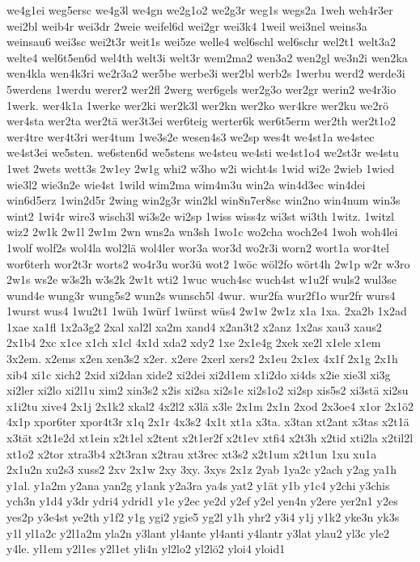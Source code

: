{we4g1ei
weg5ersc
we4g3l
we4gn
we2g1o2
we2g3r
weg1s
wegs2a
1weh
weh4r3er
wei2bl
weib4r
wei3dr
2weie
weifel6d
wei2gr
wei3k4
1weil
wei3nel
weins3a
weinsau6
wei3sc
wei2t3r
weit1s
wei5ze
welle4
wel6schl
wel6schr
wel2t1
welt3a2
welte4
wel6t5en6d
wel4th
welt3i
welt3r
wem2ma2
wen3a2
wen2gl
we3n2i
wen2ka
wen4kla
wen4k3ri
we2r3a2
wer5be
werbe3i
wer2bl
werb2s
1werbu
werd2
werde3i
5werdens
1werdu
werer2
wer2fl
2werg
wer6gels
wer2g3o
wer2gr
werin2
we4r3io
1werk.
wer4k1a
1werke
wer2ki
wer2k3l
wer2kn
wer2ko
wer4kre
wer2ku
we2rö
wer4sta
wer2ta
wer2tä
wer3t3ei
wer6teig
werter6k
wer6t5erm
wer2th
wer2t1o2
wer4tre
wer4t3ri
wer4tum
1we3s2e
wesen4s3
we2sp
wes4t
we4st1a
we4stec
we4st3ei
we5sten.
we6sten6d
we5stens
we4steu
we4sti
we4st1o4
we2st3r
we4stu
1wet
2wets
wett3s
2w1ey
2w1g
whi2
w3ho
w2i
wicht4s
1wid
wi2e
2wieb
1wied
wie3l2
wie3n2e
wie4st
1wild
wim2ma
wim4m3u
win2a
win4d3ec
win4dei
win6d5erz
1win2d5r
2wing
win2g3r
win2kl
win8n7er8sc
win2no
win4num
win3s
wint2
1wi4r
wire3
wisch3l
wi3s2e
wi2sp
1wiss
wiss4z
wi3st
wi3th
1witz.
1witzl
wiz2
2w1k
2w1l
2w1m
2wn
wns2a
wn3sh
1wo1c
wo2cha
woch2e4
1woh
woh4lei
1wolf
wolf2s
wol4la
wol2lä
wol4ler
wor3a
wor3d
wo2r3i
worn2
wort1a
wor4tel
wor6terh
wor2t3r
worts2
wo4r3u
wor3ü
wot2
1wöc
wöl2fo
wört4h
2w1p
w2r
w3ro
2w1s
ws2e
w3s2h
w3s2k
2w1t
wti2
1wuc
wuch4sc
wuch4st
w1u2f
wuls2
wul3se
wund4e
wung3r
wung5s2
wun2s
wunsch5l
4wur.
wur2fa
wur2f1o
wur2fr
wurs4
1wurst
wus4
1wu2t1
1wüh
1würf
1würst
wüs4
2w1w
2w1z
x1a
1xa.
2xa2b
1x2ad
1xae
xa1fl
1x2a3g2
2xal
xal2l
xa2m
xand4
x2an3t2
x2anz
1x2as
xau3
xaus2
2x1b4
2xc
x1ce
x1ch
x1cl
4x1d
xda2
xdy2
1xe
2x1e4g
2xek
xe2l
x1ele
x1em
3x2em.
x2ems
x2en
xen3s2
x2er.
x2ere
2xerl
xers2
2x1eu
2x1ex
4x1f
2x1g
2x1h
xib4
xi1c
xich2
2xid
xi2dan
xide2
xi2dei
xi2d1em
x1i2do
xi4ds
x2ie
xie3l
xi3g
xi2ler
xi2lo
xi2l1u
xim2
xin3s2
x2is
xi2sa
xi2s1e
xi2s1o2
xi2sp
xis5s2
xi3stä
xi2su
x1i2tu
xive4
2x1j
2x1k2
xkal2
4x2l2
x3lä
x3le
2x1m
2x1n
2xod
2x3oe4
x1or
2x1ö2
4x1p
xpor6ter
xpor4t3r
x1q
2x1r
4x3s2
4x1t
xt1a
x3ta.
x3tan
xt2ant
x3tas
x2t1ä
x3tät
x2t1e2d
xt1ein
x2t1el
x2tent
x2t1er2f
x2t1ev
xtfi4
x2t3h
x2tid
xti2la
x2til2l
xt1o2
x2tor
xtra3b4
x2t3ran
x2trau
xt3rec
xt3s2
x2t1um
x2t1un
1xu
xu1a
2x1u2n
xu2s3
xuss2
2xv
2x1w
2xy
3xy.
3xys
2x1z
2yab
1ya2c
y2ach
y2ag
ya1h
y1al.
y1a2m
y2ana
yan2g
y1ank
y2a3ra
ya4s
yat2
y1ät
y1b
y1c4
y2chi
y3chis
ych3n
y1d4
y3dr
ydri4
ydrid1
y1e
y2ec
ye2d
y2ef
y2el
yen4n
y2ere
yer2n1
y2es
yes2p
y3e4st
ye2th
y1f2
y1g
ygi2
ygie5
yg2l
y1h
yhr2
y3i4
y1j
y1k2
yke3n
yk3s
y1l
yl1a2c
y2l1a2m
yla2n
y3lant
yl4ante
yl4anti
y4lantr
y3lat
ylau2
yl3c
yle2
y4le.
yl1em
y2l1es
y2l1et
yli4n
yl2lo2
yl2lö2
yloi4
yloid1
}
